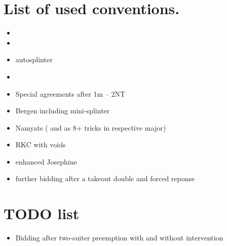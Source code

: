 \documentclass[12pt,a4paper,twoside]{article}
\begin{document}
  \section{List of used conventions.}
  \begin{itemize}
    \item 
    \item 
    \item autosplinter
    \item 
    \item Special agreements after 1m -- 2NT
    \item Bergen including mini-splinter
    \item Namyats ( and  as 8+ tricks in respective major)
    \item RKC with voids
    \item enhanced Josephine 
    \item further bidding after a takeout double and forced reponse
  \end{itemize}

  \section{TODO list}
  \begin{itemize}
    \item Bidding after two-suiter preemption with and without intervention
  \end{itemize}
\end{document}
